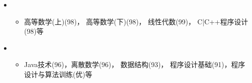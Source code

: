   \begin{itemize}[leftmargin=*]
    \item
      {\small
      \begin{itemize}
        \item{高等数学(上)(98)， 高等数学(下)(98)， 线性代数(99)， C|C++程序设计(98)等}
      \end{itemize}
      }
    \item
      {\small
      \begin{itemize}
        \item{Java技术(96)，离散数学(96)， 数据结构(93)， 程序设计基础(91)，程序设计与算法训练(优)等}
      \end{itemize}
      }
  \end{itemize}